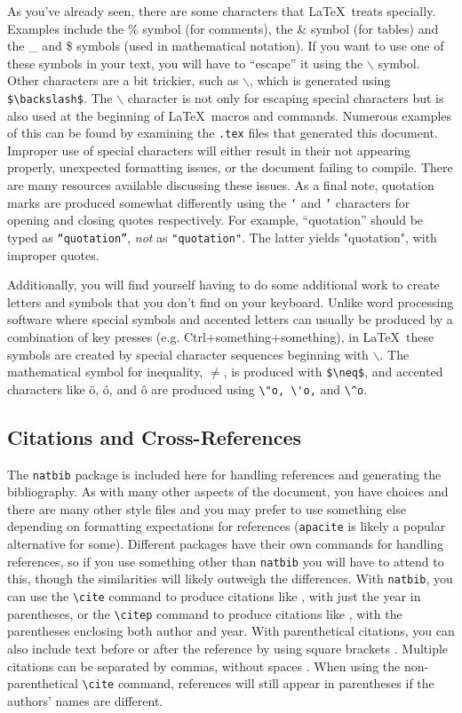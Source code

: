 As you've already seen, there are some characters that \LaTeX ~treats 
specially. Examples include the \% symbol (for comments), the \& symbol
(for tables) and the \_ and \$ symbols (used in mathematical notation).
If you want to use one of these symbols in your text, you will have to
``escape'' it using the $\backslash$ symbol. Other characters are a bit 
trickier, such as $\backslash$, which is generated using \verb+$\backslash$+.
The $\backslash$ character is not only for escaping special characters but
is also used at the beginning of \LaTeX ~macros and commands. Numerous examples
of this can be found by examining the {\tt .tex} files that generated this
document.
Improper use of special characters will either result in their not appearing
properly, unexpected formatting issues, or the document failing to compile.
There are many resources available discussing these issues. As a final note,
quotation marks are produced somewhat differently using the {\tt `} and {\tt '}
characters for opening and closing quotes respectively. For example, 
``quotation'' should be typed as {\tt ``quotation''}, {\it not} as 
{\tt "quotation"}. The latter yields "quotation", with improper quotes.

Additionally, you will find yourself having to do some additional work to
create letters and symbols that you don't find on your keyboard. Unlike
word processing software where special symbols and accented letters can usually
be produced by a combination of key presses (e.g. Ctrl+something+something),
in \LaTeX ~these symbols are created by special character sequences beginning
with $\backslash$. The mathematical symbol for inequality, $\neq$, is produced
with \verb+$\neq$+, and accented characters like \"o, \'o, and \^o are produced
using \verb+\"o, \'o,+ and \verb+\^o+.

\subsection{Citations and Cross-References}

The {\tt natbib} package is included here for handling references and
generating the bibliography. As with many other aspects of the document, you
have choices and there are many other style files and you may prefer to use
something else depending on formatting expectations for references
({\tt apacite} is likely a popular alternative for some). Different packages
have their own commands for handling references, so if you use
something other than {\tt natbib} you will have to attend to this, though
the similarities will likely outweigh the differences. With {\tt natbib},
you can use the \verb+\cite+ command to produce citations like 
\cite{baayen:2008}, with just the year in parentheses, or the \verb+\citep+
command to produce citations like \citep{gaylord:2013}, with the parentheses
enclosing both author and year. With parenthetical citations, you can also
include text before or after the reference by using square brackets
\citep[for example][and others]{kilgarriff:2004}. Multiple citations can be 
separated by commas, without spaces \citep{cruse:2000,klepousniotou:2008}. 
When using the non-parenthetical \verb+\cite+ command, references will still 
appear in parentheses if the authors' names are different.

